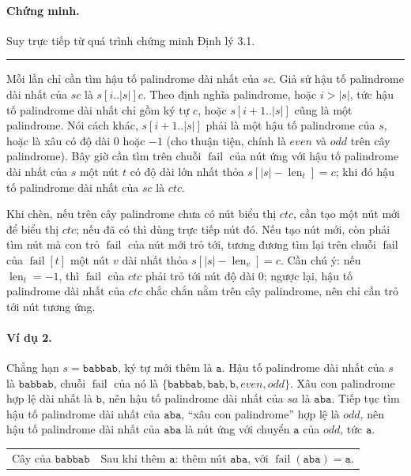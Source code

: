 \documentclass[11pt]{article}
\newcommand{\qedmark}{\hfill\rule{0.7ex}{0.7ex}}
\begin{document}
\paragraph{Chứng minh.}
Suy trực tiếp từ quá trình chứng minh Định lý 3.1. \qedmark

Mỗi lần chỉ cần tìm hậu tố palindrome dài nhất của \(sc\). Giả sử hậu tố
palindrome dài nhất của \(sc\) là \(s[i..|s|]c\). Theo định nghĩa palindrome,
hoặc \(i>|s|\), tức hậu tố palindrome dài nhất chỉ gồm ký tự \(c\), hoặc
\(s[i+1..|s|]\) cũng là một palindrome. Nói cách khác, \(s[i+1..|s|]\) phải là
một hậu tố palindrome của \(s\), hoặc là xâu có độ dài \(0\) hoặc \(-1\) (cho
thuận tiện, chính là \(\textit{even}\) và \(\textit{odd}\) trên cây
palindrome). Bây giờ cần tìm trên chuỗi \(\operatorname{fail}\) của nút ứng
với hậu tố palindrome dài nhất của \(s\) một nút \(t\) có độ dài lớn nhất thỏa
\(s[|s|-\operatorname{len}_t]=c\); khi đó hậu tố palindrome dài nhất của \(sc\)
là \(ctc\).

Khi chèn, nếu trên cây palindrome chưa có nút biểu thị \(ctc\), cần tạo một
nút mới để biểu thị \(ctc\); nếu đã có thì dùng trực tiếp nút đó. Nếu tạo nút
mới, còn phải tìm nút mà con trỏ \(\operatorname{fail}\) của nút mới trỏ tới,
tương đương tìm lại trên chuỗi \(\operatorname{fail}\) của
\(\operatorname{fail}[t]\) một nút \(v\) dài nhất thỏa
\(s[|s|-\operatorname{len}_v]=c\). Cần chú ý: nếu \(\operatorname{len}_t=-1\),
thì \(\operatorname{fail}\) của \(ctc\) phải trỏ tới nút độ dài \(0\); ngược
lại, hậu tố palindrome dài nhất của \(ctc\) chắc chắn nằm trên cây palindrome,
nên chỉ cần trỏ tới nút tương ứng.

\paragraph{Ví dụ 2.}
Chẳng hạn \(s=\texttt{babbab}\), ký tự mới thêm là \(\texttt{a}\). Hậu tố
palindrome dài nhất của \(s\) là \(\texttt{babbab}\), chuỗi
\(\operatorname{fail}\) của nó là
\(\{\texttt{babbab},\texttt{bab},\texttt{b},\textit{even},\textit{odd}\}\).
Xâu con palindrome hợp lệ dài nhất là \(\texttt{b}\), nên hậu tố palindrome
dài nhất của \(sa\) là \(\texttt{aba}\). Tiếp tục tìm hậu tố palindrome dài
nhất của \(\texttt{aba}\), ``xâu con palindrome'' hợp lệ là \(\textit{odd}\),
nên hậu tố palindrome dài nhất của \(\texttt{aba}\) là nút ứng với chuyển
\(\texttt{a}\) của \(\textit{odd}\), tức \(\texttt{a}\).

\begin{center}
\small
\begin{tabular}{c@{\qquad}c}
Cây của \(\texttt{babbab}\) &
Sau khi thêm \(\texttt{a}\): thêm nút \(\texttt{aba}\), với
\(\operatorname{fail}(\texttt{aba})=\texttt{a}\).
\end{tabular}
\end{center}
\end{document}
